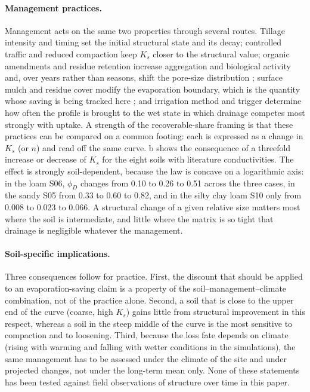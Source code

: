\paragraph{Management practices.} Management acts on the same two properties through several routes. Tillage intensity and timing set the initial structural state and its decay; controlled traffic and reduced compaction keep $K_s$ closer to the structural value; organic amendments and residue retention increase aggregation and biological activity and, over years rather than seasons, shift the pore-size distribution \citep{Brady2016,Hillel1998}; surface mulch and residue cover modify the evaporation boundary, which is the quantity whose saving is being tracked here \citep{Vuaille2024,Leuther2026}; and irrigation method and trigger determine how often the profile is brought to the wet state in which drainage competes most strongly with uptake. A strength of the recoverable-share framing is that these practices can be compared on a common footing: each is expressed as a change in $K_s$ (or $n$) and read off the same curve. b shows the consequence of a threefold increase or decrease of $K_s$ for the eight soils with literature conductivities. The effect is strongly soil-dependent, because the law is concave on a logarithmic axis: in the loam S06, $\phi_D$ changes from 0.10 to 0.26 to 0.51 across the three cases, in the sandy S05 from 0.33 to 0.60 to 0.82, and in the silty clay loam S10 only from 0.008 to 0.023 to 0.066. A structural change of a given relative size matters most where the soil is intermediate, and little where the matrix is so tight that drainage is negligible whatever the management.

\paragraph{Soil-specific implications.} Three consequences follow for practice. First, the discount that should be applied to an evaporation-saving claim is a property of the soil--management--climate combination, not of the practice alone. Second, a soil that is close to the upper end of the curve (coarse, high $K_s$) gains little from structural improvement in this respect, whereas a soil in the steep middle of the curve is the most sensitive to compaction and to loosening. Third, because the loss fate depends on climate (rising with warming and falling with wetter conditions in the simulations), the same management has to be assessed under the climate of the site and under projected changes, not under the long-term mean only. None of these statements has been tested against field observations of structure over time in this paper.

